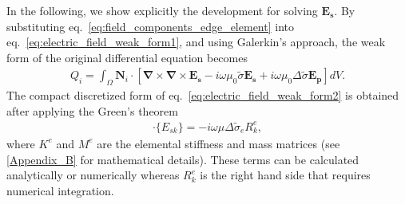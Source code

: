 \documentclass[review]{elsarticle}
\begin{document}
In the following, we show explicitly the development for solving $\mathbf{E_s}$. By substituting eq.~\eqref{eq:field_components_edge_element} into eq.~\eqref{eq:electric_field_weak_form1}, and using Galerkin's approach, the weak form of the original differential equation becomes
\begin{align}
Q_{i} = \int_{\Omega} \mathbf N_{i} \cdot [ \boldsymbol{\nabla} \times \boldsymbol{\nabla} \times \mathbf{E_{s}} -i \omega \mu_{0} \tilde{\sigma} \mathbf{E_{s}} + i \omega \mu_{0} \Delta \tilde{\sigma} \mathbf{E_{p}} ] dV.
\label{eq:electric_field_weak_form2}
\end{align}
The compact discretized form of eq.~\eqref{eq:electric_field_weak_form2} is obtained after applying the Green's theorem
\begin{align}
[K^{e}_{jk} + i \omega \tilde{\sigma}_{e} M^{e}_{jk}] \cdot  \{ E_{sk} \} = - i \omega \mu \Delta \tilde{\sigma}_{e} R^{e}_k,
\label{eq:system_eq_edge_electric}
\end{align}
where $K^{e}$ and $M^{e}$ are the elemental stiffness and mass matrices (see \ref{Appendix_B} for mathematical details). These terms can be calculated analytically or numerically \citep{Jin2002} whereas $R^{e}_k$ is the right hand side that requires numerical integration.
\end{document}
